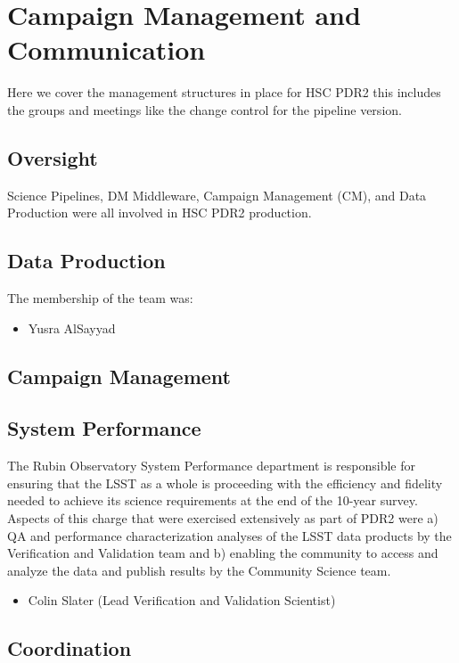 \section{Campaign Management and Communication} \label{sec:management}

Here we cover the management structures in place for HSC PDR2 
this includes the groups and meetings like the change control for 
the pipeline version.

\subsection{Oversight}

Science Pipelines, DM Middleware, Campaign Management (CM), and Data Production
were all involved in HSC PDR2 production.

\subsection{Data Production}

The membership of the team was:
\begin{itemize}
\item Yusra AlSayyad
\end{itemize}


\subsection{Campaign Management}

\subsection{System Performance}
The Rubin Observatory System Performance department is responsible for ensuring that the LSST as a whole is proceeding with the efficiency and fidelity needed to achieve its science requirements at the end of the 10-year survey. 
Aspects of this charge that were exercised extensively as part of PDR2 were a) QA and performance characterization analyses of the LSST data products by the Verification and Validation team and b) enabling the community to access and analyze the data and publish results by the Community Science team.
\begin{itemize}

\item Colin Slater (Lead Verification and Validation Scientist)
\end{itemize}


\subsection{Coordination}

